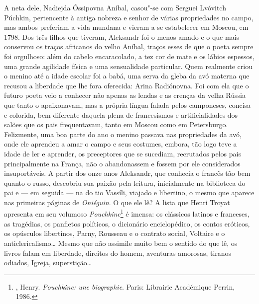 A neta dele, Nadiejda Óssipovna Aníbal, casou"-se com Serguei Lvóvitch
Púchkin, pertencente à antiga nobreza e senhor de várias
propriedades no campo, mas ambos preferiam a vida mundana e vieram a se
estabelecer em Moscou, em 1798. Dos três filhos que tiveram, Aleksandr
foi o menos amado e o que mais conservou os traços africanos do velho
Aníbal, traços esses de que o poeta sempre foi orgulhoso: além do cabelo
encaracolado, a tez cor de mate e os lábios espessos, uma grande
agilidade física e uma sensualidade particular. Quem realmente criou o
menino até a idade escolar foi a babá, uma serva da gleba da avó
materna que recusou a liberdade que lhe fora oferecida: Arina
Radiónovna. Foi com ela que o futuro poeta veio a conhecer não apenas as
lendas e as crenças da velha Rússia que tanto o apaixonavam, mas a própria
língua falada pelos camponeses, concisa e colorida, bem diferente
daquela plena de francesismos e artificialidades dos salões que os pais
frequentavam, tanto em Moscou como em Petersburgo. Felizmente, uma boa
parte do ano o menino passava nas propriedades da avó, onde ele aprendeu
a amar o campo e seus costumes, embora, tão logo teve a idade de ler e
aprender, os preceptores que se sucediam, recrutados pelos pais
principalmente na França, não o abandonassem e fossem por ele
considerados insuportáveis. A partir dos onze anos Aleksandr, que
conhecia o francês tão bem quanto o russo, descobriu sua paixão pela
leitura, inicialmente na biblioteca do pai e --- em seguida --- na
do tio Vassíli, viajado e libertino, o mesmo que aparece nas
primeiras páginas de \emph{Oniéguin}. O que ele lê? A lista que
Henri Troyat apresenta em seu volumoso
\emph{Pouchkine}\footnote{, Henry.
\emph{Pouchkine: une biographie}. Paris: Librairie Académique Perrin,
1986.} é imensa: os clássicos latinos e franceses, as tragédias, os
panfletos políticos, o dicionário enciclopédico, os contos eróticos,
os opúsculos libertinos, Parny, Rousseau e o contrato social,
Voltaire e o anticlericalismo\ldots{} Mesmo que não assimile muito
bem o sentido do que lê, os livros falam em liberdade, direitos do
homem, aventuras amorosas, tiranos odiados, Igreja, superstição\ldots{}


